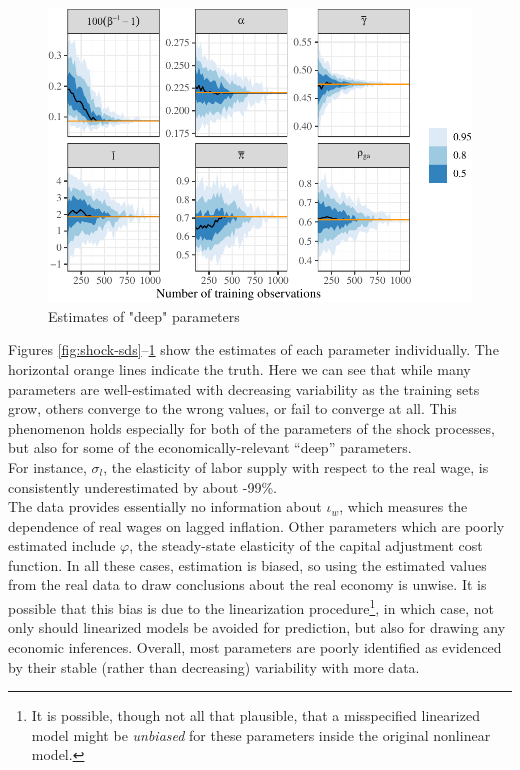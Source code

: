 \documentclass[11pt]{article}
\begin{document}
\begin{figure}[t]

{\centering \includegraphics{gfx/deep3-1} 

}

\caption{Estimates of "deep" parameters}\label{fig:deep3}
\end{figure}

Figures \ref{fig:shock-sds}--\ref{fig:deep3} show the estimates of each
parameter individually. The horizontal orange lines indicate the truth.
Here we can see that while many parameters are well-estimated with
decreasing variability as the training sets grow, others converge to the
wrong values, or fail to converge at all. This phenomenon holds
especially for both of the parameters of the shock processes, but also
for some of the economically-relevant ``deep'' parameters.\\
For instance, \(\sigma_l\), the elasticity of labor supply with respect
to the real wage, is consistently underestimated by about -99\%.\\
The data provides essentially no information about \(\iota_w\), which
measures the dependence of real wages on lagged inflation. Other
parameters which are poorly estimated include \(\varphi\), the
steady-state elasticity of the capital adjustment cost function. In all
these cases, estimation is biased, so using the estimated values from
the real data to draw conclusions about the real economy is unwise. It
is possible that this bias is due to the linearization
procedure\footnote{It is possible, though not all that plausible, that a
  misspecified linearized model might be \emph{unbiased} for these
  parameters inside the original nonlinear model.}, in which case, not
only should linearized models be avoided for prediction, but also for
drawing any economic inferences. Overall, most parameters are poorly
identified as evidenced by their stable (rather than decreasing)
variability with more data.
\end{document}
